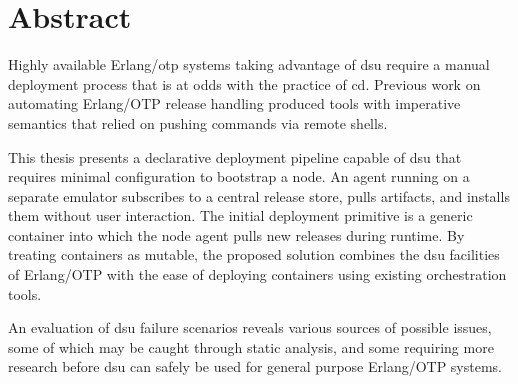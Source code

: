 \cleardoublepage{}

\section*{Abstract}

Highly available Erlang/\acrshort{otp} systems taking advantage of \acrfull{dsu} require a manual deployment process that is at odds with the practice of \acrlong{cd}. Previous work on automating Erlang/OTP release handling produced tools with imperative semantics that relied on pushing commands via remote shells.

This thesis presents a declarative deployment pipeline capable of \acrshort{dsu} that requires minimal configuration to bootstrap a node. An agent running on a separate emulator subscribes to a central release store, pulls artifacts, and installs them without user interaction. The initial deployment primitive is a generic container into which the node agent pulls new releases during runtime. By treating containers as mutable, the proposed solution combines the \acrshort{dsu} facilities of Erlang/OTP with the ease of deploying containers using existing orchestration tools.

An evaluation of \acrshort{dsu} failure scenarios reveals various sources of possible issues, some of which may be caught through static analysis, and some requiring more research before \acrshort{dsu} can safely be used for general purpose Erlang/OTP systems.
